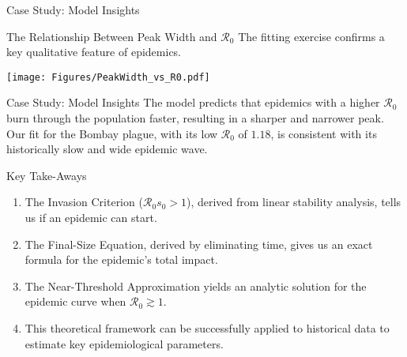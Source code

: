 \documentclass[14pt,aspectratio=169]{beamer}
\newcommand{\RR}{\mathcal{R}_0}
\begin{document}
\begin{frame}{Case Study: Model Insights}
    \begin{block}{The Relationship Between Peak Width and $\RR$}
        The fitting exercise confirms a key qualitative feature of epidemics.
    \end{block}
    \centering
    \texttt{[image: Figures/PeakWidth\_vs\_R0.pdf]}
    \vspace{0.7em}
\end{frame}
\begin{frame}{Case Study: Model Insights}
    \vspace{0.7em}
    The model predicts that epidemics with a higher $\RR$ burn through the population faster, resulting in a \alert{sharper and narrower peak}. Our fit for the Bombay plague, with its low $\RR$ of $1.18$, is consistent with its historically slow and wide epidemic wave.
\end{frame}

\begin{frame}{Key Take-Aways}
    \begin{enumerate}
        \item The \alert{Invasion Criterion} ($\RR s_0 > 1$), derived from linear stability analysis, tells us if an epidemic can start.
        \pause
        \item The \alert{Final-Size Equation}, derived by eliminating time, gives us an exact formula for the epidemic's total impact.
        \pause
        \item The \alert{Near-Threshold Approximation} yields an analytic solution for the epidemic curve when $\RR \gtrsim 1$.
        \pause
        \item This theoretical framework can be successfully \alert{applied to historical data} to estimate key epidemiological parameters.
    \end{enumerate}
\end{frame}
\end{document}

